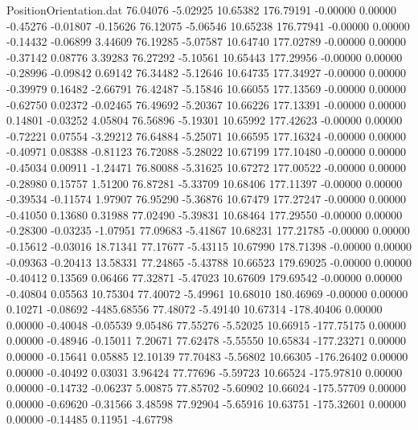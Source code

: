 \begin{filecontents}{PositionOrientation.dat}
  76.04076   -5.02925   10.65382   176.79191   -0.00000    0.00000   -0.45276   -0.01807   -0.15626
  76.12075   -5.06546   10.65238   176.77941   -0.00000    0.00000   -0.14432   -0.06899    3.44609
  76.19285   -5.07587   10.64740   177.02789   -0.00000    0.00000   -0.37142    0.08776    3.39283
  76.27292   -5.10561   10.65443   177.29956   -0.00000    0.00000   -0.28996   -0.09842    0.69142
  76.34482   -5.12646   10.64735   177.34927   -0.00000    0.00000   -0.39979    0.16482   -2.66791
  76.42487   -5.15846   10.66055   177.13569   -0.00000    0.00000   -0.62750    0.02372   -0.02465
  76.49692   -5.20367   10.66226   177.13391   -0.00000    0.00000    0.14801   -0.03252    4.05804
  76.56896   -5.19301   10.65992   177.42623   -0.00000    0.00000   -0.72221    0.07554   -3.29212
  76.64884   -5.25071   10.66595   177.16324   -0.00000    0.00000   -0.40971    0.08388   -0.81123
  76.72088   -5.28022   10.67199   177.10480   -0.00000    0.00000   -0.45034    0.00911   -1.24471
  76.80088   -5.31625   10.67272   177.00522   -0.00000    0.00000   -0.28980    0.15757    1.51200
  76.87281   -5.33709   10.68406   177.11397   -0.00000    0.00000   -0.39534   -0.11574    1.97907
  76.95290   -5.36876   10.67479   177.27247   -0.00000    0.00000   -0.41050    0.13680    0.31988
  77.02490   -5.39831   10.68464   177.29550   -0.00000    0.00000   -0.28300   -0.03235   -1.07951
  77.09683   -5.41867   10.68231   177.21785   -0.00000    0.00000   -0.15612   -0.03016   18.71341
  77.17677   -5.43115   10.67990   178.71398   -0.00000    0.00000   -0.09363   -0.20413   13.58331
  77.24865   -5.43788   10.66523   179.69025   -0.00000    0.00000   -0.40412    0.13569    0.06466
  77.32871   -5.47023   10.67609   179.69542   -0.00000    0.00000   -0.40804    0.05563   10.75304
  77.40072   -5.49961   10.68010   180.46969   -0.00000    0.00000    0.10271   -0.08692 -4485.68556
  77.48072   -5.49140   10.67314  -178.40406    0.00000    0.00000   -0.40048   -0.05539    9.05486
  77.55276   -5.52025   10.66915  -177.75175    0.00000    0.00000   -0.48946   -0.15011    7.20671
  77.62478   -5.55550   10.65834  -177.23271    0.00000    0.00000   -0.15641    0.05885   12.10139
  77.70483   -5.56802   10.66305  -176.26402    0.00000    0.00000   -0.40492    0.03031    3.96424
  77.77696   -5.59723   10.66524  -175.97810    0.00000    0.00000   -0.14732   -0.06237    5.00875
  77.85702   -5.60902   10.66024  -175.57709    0.00000    0.00000   -0.69620   -0.31566    3.48598
  77.92904   -5.65916   10.63751  -175.32601    0.00000    0.00000   -0.14485    0.11951   -4.67798

\end{filecontents}
